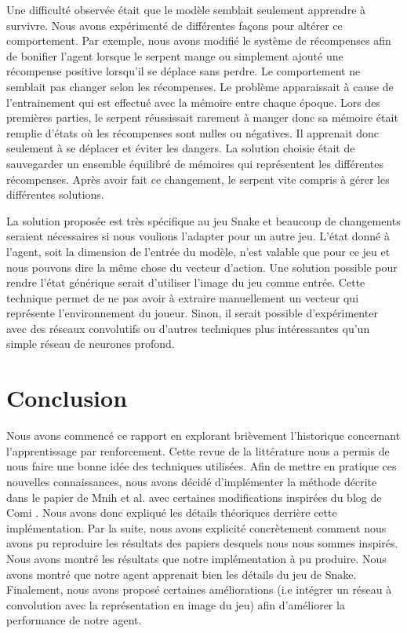 \documentclass{article}
\begin{document}
Une difficulté observée était que le modèle semblait seulement apprendre à survivre. Nous avons expérimenté de différentes façons pour altérer ce comportement. Par exemple, nous avons modifié le système de récompenses afin de bonifier l’agent lorsque le serpent mange ou simplement ajouté une récompense positive lorsqu’il se déplace sans perdre. Le comportement ne semblait pas changer selon les récompenses. Le problème apparaissait à cause de l’entrainement qui est effectué avec la mémoire entre chaque époque. Lors des premières parties, le serpent réussissait rarement à manger donc sa mémoire était remplie d’états où les récompenses sont nulles ou négatives. Il apprenait donc seulement à se déplacer et éviter les dangers. La solution choisie était de sauvegarder un ensemble équilibré de mémoires qui représentent les différentes récompenses. Après avoir fait ce changement, le serpent vite compris à gérer les différentes solutions.

La solution proposée est très spécifique au jeu Snake et beaucoup de changements seraient nécessaires si nous voulions l’adapter pour un autre jeu. L’état donné à l’agent, soit la dimension de l’entrée du modèle, n’est valable que pour ce jeu et nous pouvons dire la même chose du vecteur d’action. Une solution possible pour rendre l’état générique serait d’utiliser l’image du jeu comme entrée. Cette technique permet de ne pas avoir à extraire manuellement un vecteur qui représente l’environnement du joueur. Sinon, il serait possible d’expérimenter avec des réseaux convolutifs ou d’autres techniques plus intéressantes qu’un simple réseau de neurones profond.

\section{Conclusion}

Nous avons commencé ce rapport en explorant brièvement l'historique concernant l'apprentissage par renforcement. Cette revue de la littérature nous a permis de nous faire une bonne idée des techniques utilisées. Afin de mettre en pratique ces nouvelles connaissances, nous avons décidé d'implémenter la méthode décrite dans le papier de Mnih et al. \cite{DBLP:journals/corr/MnihKSGAWR13} avec certaines modifications inspirées du blog de Comi \cite{comi_2020}. Nous avons donc expliqué les détails théoriques derrière cette implémentation. Par la suite, nous avons explicité concrètement comment nous avons pu reproduire les résultats des papiers desquels nous nous sommes inspirés. Nous avons montré les résultats que notre implémentation à pu produire. Nous avons montré que notre agent apprenait bien les détails du jeu de Snake. Finalement, nous avons proposé certaines améliorations (i.e intégrer un réseau à convolution avec la représentation en image du jeu) afin d'améliorer la performance de notre agent. 

\printbibliography
\end{document}
